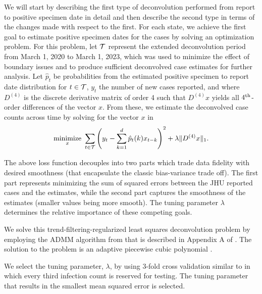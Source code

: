 \documentclass{article}
\begin{document}
We will start by describing the first type of deconvolution performed from
 report to positive specimen date in detail and
then describe the second type in terms of the changes made with respect to the first.
For each state, we achieve the first goal to estimate positive specimen dates for the
 cases by solving an optimization problem. 
For this problem, let $\mathcal{T}$ represent the extended deconvolution period from March 1, 2020 to 
March 1, 2023, which was used to minimize the effect of boundary issues and to produce
 sufficient deconvolved case estimates for further analysis.
Let $\hat{p}_t$ be probabilities from the estimated
positive specimen to report date distribution for $t \in \mathcal{T}$, $y_t$ the number of new cases
reported, and where $D^{(4)}$ is the discrete derivative matrix of order 4
such that $D^{(4)}x$ yields all $4^{\textnormal{th}}$-order differences of the vector $x$. From these,
we estimate the deconvolved case counts across time by solving for the vector $x$ in
\begin{align*}
\operatorname*{minimize}_{x}\ \sum_{t \in \mathcal{T}} \left ( y_t -  \sum_{k = 1}^{d} \hat{p}_t(k)x_{t-k} 
\right )^2 + \lambda \|D^{(4)}x\|_1. 
\end{align*}

The above loss function decouples into two parts which trade data fidelity with
desired smoothness (that
encapsulate the classic bias-variance trade off). The first part represents
minimizing the sum of squared errors between the JHU reported cases and the
estimates, while the second part captures the smoothness of the estimates
(smaller values being more smooth). The tuning parameter $\lambda$ determines
the relative importance of these competing goals.

We solve this trend-filtering-regularized least squares deconvolution problem by
employing the ADMM algorithm from \citet{ramdas2016fast} that is described in
Appendix A of \citet{jahja2022real}. The solution to the problem is an adaptive
piecewise cubic polynomial \citep{tibshirani2014adaptive,
tibshirani2022divided}.

We select the tuning parameter, $\lambda$, by using $3$-fold cross validation similar to
\citet{jahja2022real} in which every third infection count is
reserved for testing. The tuning parameter that results in the smallest mean
 squared error is selected.
\end{document}
